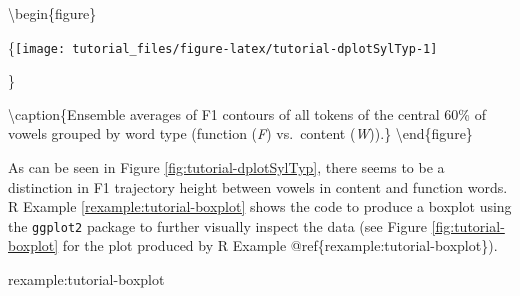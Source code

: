 \documentclass[]{book}
\newenvironment{Shaded}{\begin{snugshade}}{\end{snugshade}}
\newcommand{\CommentTok}[1]{\textcolor[rgb]{0.56,0.35,0.01}{\textit{#1}}}
\newcommand{\DataTypeTok}[1]{\textcolor[rgb]{0.13,0.29,0.53}{#1}}
\newcommand{\DecValTok}[1]{\textcolor[rgb]{0.00,0.00,0.81}{#1}}
\newcommand{\FloatTok}[1]{\textcolor[rgb]{0.00,0.00,0.81}{#1}}
\newcommand{\KeywordTok}[1]{\textcolor[rgb]{0.13,0.29,0.53}{\textbf{#1}}}
\newcommand{\NormalTok}[1]{#1}
\newcommand{\OperatorTok}[1]{\textcolor[rgb]{0.81,0.36,0.00}{\textbf{#1}}}
\newcommand{\OtherTok}[1]{\textcolor[rgb]{0.56,0.35,0.01}{#1}}
\newcommand{\StringTok}[1]{\textcolor[rgb]{0.31,0.60,0.02}{#1}}
\theoremstyle{definition}
\theoremstyle{definition}
\theoremstyle{definition}
\theoremstyle{remark}
\begin{document}
\begin{Shaded}
\end{Shaded}

\textbackslash{}begin\{figure\}

\{\centering \texttt{[image: tutorial\_files/figure-latex/tutorial-dplotSylTyp-1]}

\}

\textbackslash{}caption\{Ensemble averages of F1 contours of all tokens
of the central 60\% of vowels grouped by word type (function (\emph{F})
vs.~content (\emph{W})).\}\label{fig:tutorial-dplotSylTyp}
\textbackslash{}end\{figure\}

As can be seen in Figure \ref{fig:tutorial-dplotSylTyp}, there seems to
be a distinction in F1 trajectory height between vowels in content and
function words. R Example \ref{rexample:tutorial-boxplot} shows the code
to produce a boxplot using the \texttt{ggplot2} package to further
visually inspect the data (see Figure \ref{fig:tutorial-boxplot} for the
plot produced by R Example @ref\{rexample:tutorial-boxplot\}).

rexample:tutorial-boxplot
\end{document}
